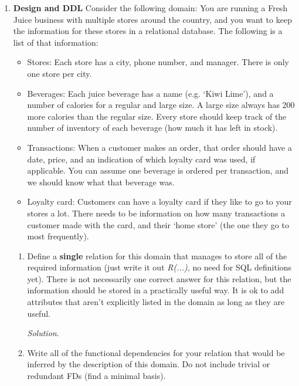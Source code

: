 \documentclass[10pt]{article}
\begin{document}
\begin{enumerate}
    \item \textbf{Design and DDL}
    Consider the following domain:
    You are running a Fresh Juice business with multiple stores around the country, and you want to keep the information for these stores in a relational database. The following is a list of that information:
    \begin{itemize}
        \item Stores: Each store has a city, phone number, and manager. There is only one store per city.
        \item Beverages: Each juice beverage has a name (e.g. ‘Kiwi Lime’), and a number of calories for a regular and large size. A large size always has 200 more calories than the regular size. Every store should keep track of the number of inventory of each beverage (how much it has left in stock).
        \item Transactions: When a customer makes an order, that order should have a date, price, and an indication of which loyalty card was used, if applicable. You can assume one beverage is ordered per transaction, and we should know what that beverage was.
        \item Loyalty card: Customers can have a loyalty card if they like to go to your stores a lot. There needs to be information on how many transactions a customer made with the card, and their ‘home store’ (the one they go to most frequently).
    \end{itemize}
    
    \begin{enumerate}
        \item Define a \textbf{single} relation for this domain that manages to store all of the required information (just write it out \textit{R(...)}, no need for SQL definitions yet). There is not necessarily one correct answer for this relation, but the information should be stored in a practically useful way. It is ok to add attributes that aren’t explicitly listed in the domain as long as they are useful.
        
        \begin{mdframed}[leftmargin=-6.5mm]
        \textit{Solution}.\\
        \end{mdframed}
        
        \item Write all of the functional dependencies for your relation that would be inferred by the description of this domain. Do not include trivial or redundant FDs (find a minimal basis).
        

\end{enumerate}
\end{enumerate}
\end{document}
